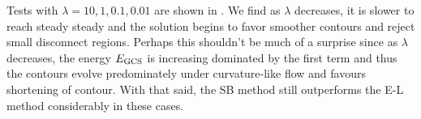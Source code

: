 Tests with $\lambda = 10, 1, 0.1, 0.01$ are shown in . We find as $\lambda$ decreases, it is slower to reach steady steady and the solution begins to favor smoother contours and reject small disconnect regions. Perhaps this shouldn't be much of a surprise since as $\lambda$ decreases, the energy $E_\textrm{GCS}$ is increasing dominated by the first term and thus the contours evolve predominately under curvature-like flow and favours shortening of contour. With that said, the SB method still outperforms the E-L method considerably in these cases.





